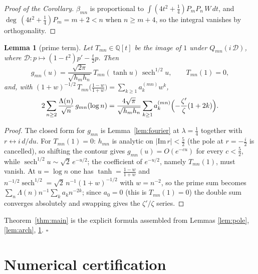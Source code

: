 \documentclass[11pt,a4paper]{article}
\newtheorem{lemma}[theorem]{Lemma}
\theoremstyle{remark}
\newcommand{\Q}{\mathbb{Q}}
\newcommand{\sech}{\operatorname{sech}}
\begin{document}
\begin{proof}[Proof of the Corollary]
$\beta_{mn}$ is proportional to
$\int (4t^2+\tfrac14)P_mP_n\,W\,dt$, and
$\deg\,(4t^2+\tfrac14)P_m = m+2 < n$ when $n\ge m+4$, so the
integral vanishes by orthogonality.
\end{proof}

\begin{lemma}[prime term]\label{lem:prime}
Let $T_{mn}\in\Q[t]$ be the image of $1$ under
$Q_{mn}(i\,\mathcal D)$, where
$\mathcal D\colon p\mapsto(1-t^2)p'-\tfrac t2 p$.  Then
\[
g_{mn}(u) = \frac{\sqrt{2\pi}}{\sqrt{h_mh_n}}\,
T_{mn}(\tanh u)\,\sech^{1/2}u,
\qquad T_{mn}(1)=0,
\]
and, with
$(1+w)^{-1/2}\,T_{mn}\bigl(\tfrac{1-w}{1+w}\bigr)
= \sum_{k\ge1}a^{(mn)}_k w^k$,
\[
2\sum_{n\ge2}\frac{\Lambda(n)}{\sqrt n}\,g_{mn}(\log n)
= \frac{4\sqrt\pi}{\sqrt{h_mh_n}}
\sum_{k\ge1} a^{(mn)}_k\Bigl(-\frac{\zeta'}{\zeta}(1+2k)\Bigr).
\]
\end{lemma}

\begin{proof}
The closed form for $g_{mn}$ is Lemma~\ref{lem:fourier} at
$\lambda=\tfrac14$ together with $r\leftrightarrow i\,d/du$.  For
$T_{mn}(1)=0$: $h_{mn}$ is analytic on
$|\mathrm{Im}\,r|<\tfrac52$ (the pole at $r=-\tfrac i2$ is
cancelled), so shifting the contour gives
$g_{mn}(u)=O(e^{-cu})$ for every $c<\tfrac52$, while
$\sech^{1/2}u\sim\sqrt2\,e^{-u/2}$; the coefficient of
$e^{-u/2}$, namely $T_{mn}(1)$, must vanish.  At $u=\log n$ one
has $\tanh = \tfrac{1-w}{1+w}$ and
$n^{-1/2}\sech^{1/2}=\sqrt2\,n^{-1}(1+w)^{-1/2}$ with
$w=n^{-2}$, so the prime sum becomes
$\sum_n \Lambda(n)n^{-1}\sum_k a_k n^{-2k}$; since $a_0=0$
(this is $T_{mn}(1)=0$) the double sum converges absolutely and
swapping gives the $\zeta'/\zeta$ series.
\end{proof}

Theorem~\ref{thm:main} is the explicit formula assembled from
Lemmas \ref{lem:pole}, \ref{lem:arch}, \ref{lem:prime}.
\hfill$\square$

\section{Numerical certification}
\end{document}
